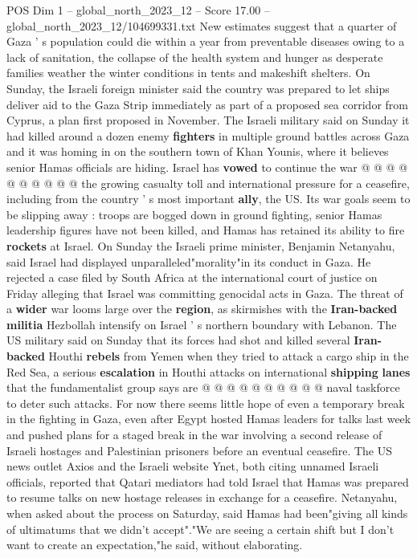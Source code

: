 \begin{textsample}{POS Dim 1 – global\_north\_2023\_12 – Score 17.00 – global\_north\_2023\_12/104699331.txt}
New estimates suggest that a quarter of Gaza ' s population could die within a year from preventable diseases owing to a lack of sanitation, the collapse of the health system and hunger as desperate families weather the winter conditions in tents and makeshift shelters.
On Sunday, the Israeli foreign minister said the country was prepared to let ships deliver aid to the Gaza Strip immediately as part of a proposed sea corridor from Cyprus, a plan first proposed in November.
The Israeli military said on Sunday it had killed around a dozen enemy \textbf{fighters} in multiple ground battles across Gaza and it was homing in on the southern town of Khan Younis, where it believes senior Hamas officials are hiding.
Israel has \textbf{vowed} to continue the war @ @ @ @ @ @ @ @ @ @ the growing casualty toll and international pressure for a ceasefire, including from the country ' s most important \textbf{ally}, the US.
Its war goals seem to be slipping away : troops are bogged down in ground fighting, senior Hamas leadership figures have not been killed, and Hamas has retained its ability to fire \textbf{rockets} at Israel.
On Sunday the Israeli prime minister, Benjamin Netanyahu, said Israel had displayed unparalleled"morality"in its conduct in Gaza.
He rejected a case filed by South Africa at the international court of justice on Friday alleging that Israel was committing genocidal acts in Gaza.
The threat of a \textbf{wider} war looms large over the \textbf{region}, as skirmishes with the \textbf{Iran-backed} \textbf{militia} Hezbollah intensify on Israel ' s northern boundary with Lebanon.
The US military said on Sunday that its forces had shot and killed several \textbf{Iran-backed} Houthi \textbf{rebels} from Yemen when they tried to attack a cargo ship in the Red Sea, a serious \textbf{escalation} in Houthi attacks on international \textbf{shipping} \textbf{lanes} that the fundamentalist group says are @ @ @ @ @ @ @ @ @ @ naval taskforce to deter such attacks.
For now there seems little hope of even a temporary break in the fighting in Gaza, even after Egypt hosted Hamas leaders for talks last week and pushed plans for a staged break in the war involving a second release of Israeli hostages and Palestinian prisoners before an eventual ceasefire.
The US news outlet Axios and the Israeli website Ynet, both citing unnamed Israeli officials, reported that Qatari mediators had told Israel that Hamas was prepared to resume talks on new hostage releases in exchange for a ceasefire.
Netanyahu, when asked about the process on Saturday, said Hamas had been"giving all kinds of ultimatums that we didn't accept"."We are seeing a certain shift but I don't want to create an expectation,"he said, without elaborating.

\end{textsample}
